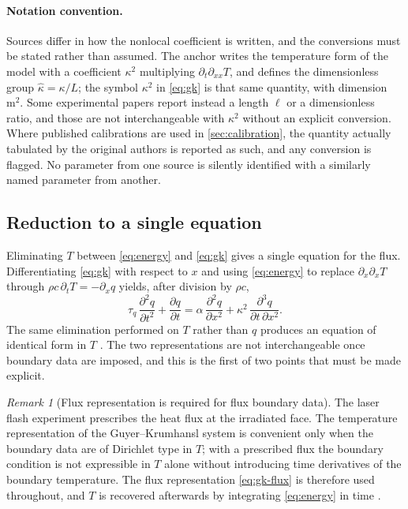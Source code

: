 \documentclass[preprint,12pt,a4paper]{elsarticle}
\theoremstyle{plain}
\theoremstyle{definition}
\theoremstyle{remark}
\newtheorem{remark}{Remark}
\newcommand{\tq}{\tau_{q}}
\newcommand{\kk}{\kappa^{2}}
\begin{document}
\paragraph{Notation convention.}
Sources differ in how the nonlocal coefficient is written, and the conversions
must be stated rather than assumed. The anchor \cite{Kovacs2018} writes the
temperature form of the model with a coefficient $\kappa^{2}$ multiplying
$\partial_{t}\partial_{xx}T$, and defines the dimensionless group
$\hat{\kappa} = \kappa/L$; the symbol $\kk$ in \eqref{eq:gk} is that same
quantity, with dimension $\si{\metre\squared}$. Some experimental papers report
instead a length $\ell$ or a dimensionless ratio, and those are not
interchangeable with $\kk$ without an explicit conversion. Where published
calibrations are used in \cref{sec:calibration}, the quantity actually
tabulated by the original authors is reported as such, and any conversion is
flagged. No parameter from one source is silently identified with a
similarly named parameter from another.

\subsection{Reduction to a single equation}
\label{sec:model-reduction}

Eliminating $T$ between \eqref{eq:energy} and \eqref{eq:gk} gives a single
equation for the flux. Differentiating \eqref{eq:gk} with respect to $x$ and
using \eqref{eq:energy} to replace $\partial_{x}\partial_{x}T$ through
$\rho c \, \partial_{t} T = -\partial_{x} q$ yields, after division by
$\rho c$,
%
\begin{equation}
  \tq \, \frac{\partial^{2} q}{\partial t^{2}}
  + \frac{\partial q}{\partial t}
  = \alpha \, \frac{\partial^{2} q}{\partial x^{2}}
  + \kk \, \frac{\partial^{3} q}{\partial t \, \partial x^{2}} .
  \label{eq:gk-flux}
\end{equation}
%
The same elimination performed on $T$ rather than $q$ produces an equation of
identical form in $T$ \cite{Kovacs2018}. The two representations are not
interchangeable once boundary data are imposed, and this is the first of two
points that must be made explicit.

\begin{remark}[Flux representation is required for flux boundary data]
\label{rem:qrep}
The laser flash experiment prescribes the heat flux at the irradiated face.
The temperature representation of the Guyer--Krumhansl system is convenient
only when the boundary data are of Dirichlet type in $T$; with a prescribed
flux the boundary condition is not expressible in $T$ alone without
introducing time derivatives of the boundary temperature. The flux
representation \eqref{eq:gk-flux} is therefore used throughout, and $T$ is
recovered afterwards by integrating \eqref{eq:energy} in time
\cite{Kovacs2018,KovacsVan2015}.
\end{remark}
\end{document}
